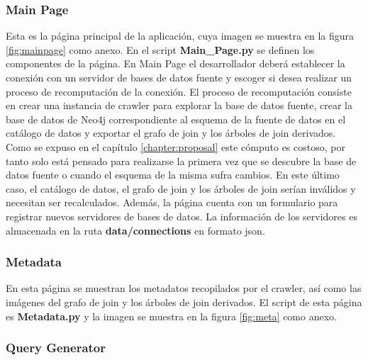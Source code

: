\subsubsection{Main Page}

Esta es la página principal de la aplicación, cuya imagen se muestra en la figura \ref{fig:mainpage} como anexo. 
En el script \textbf{Main\_Page.py} se definen 
los componentes de la página. En Main Page el desarrollador deber\'a establecer la conexión con un servidor de 
bases de datos fuente y escoger si desea realizar un proceso de recomputaci\'on de la conexión. El 
proceso de recomputaci\'on consiste en crear una instancia de crawler para explorar la base de datos 
fuente, crear la base de datos de Neo4j correspondiente al esquema de la fuente de datos en el catálogo 
de datos y exportar el grafo de join y los \'arboles de join derivados. Como se expuso en el capítulo 
\ref{chapter:proposal} este cómputo es costoso, por tanto solo est\'a pensado para realizarse la primera 
vez que se descubre la base de datos fuente o cuando el esquema de la misma sufra cambios. En este \'ultimo caso, 
el catálogo de datos, el grafo de join y los \'arboles de join serían inválidos y necesitan ser recalculados. 
Además, la página cuenta con un formulario para registrar nuevos servidores de bases de datos. La información 
de los servidores es almacenada en la ruta \textbf{data/connections} en formato json.

\subsubsection{Metadata}

En esta página se muestran los metadatos recopilados por el crawler, as\'i como las imágenes del 
grafo de join y los \'arboles de join derivados. El script de esta página es \textbf{Metadata.py} y 
la imagen se muestra en la figura \ref{fig:meta} como anexo.

\subsubsection{Query Generator}

